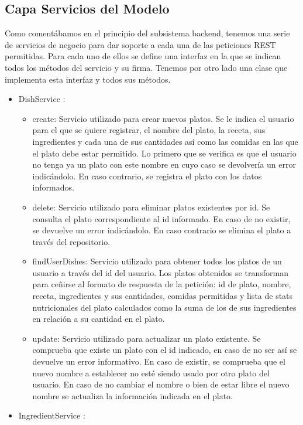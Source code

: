 \documentclass[12pt, a4paper, twoside]{book}
\begin{document}
	\subsection{Capa Servicios del Modelo}
	Como comentábamos en el principio del subsistema backend, tenemos una serie de servicios de negocio para dar soporte a cada una de las peticiones REST permitidas. 
	Para cada uno de ellos se define una interfaz en la que se indican todos los métodos del servicio y su firma. Tenemos por otro lado una clase que implementa esta interfaz y todos sus métodos.
	\begin{itemize}
		\item DishService : 
		\begin{itemize}
			\item create: Servicio utilizado para crear nuevos platos. Se le indica el usuario para el que se quiere registrar, el nombre del plato, la receta, sus ingredientes y cada una de sus cantidades así como las comidas en las que el plato debe estar permitido. Lo primero que se verifica es que el usuario no tenga ya un plato con este nombre en cuyo caso se devolvería un error indicándolo. En caso contrario, se registra el plato con los datos informados.
			\item delete: Servicio utilizado para eliminar platos existentes por id. Se consulta el plato correspondiente al id informado. En caso de no existir, se devuelve un error indicándolo. En caso contrario se elimina el plato a través del repositorio.
			\item findUserDishes: Servicio utilizado para obtener todos los platos de un usuario a través del id del usuario. Los platos obtenidos se transforman para ceñirse al formato de respuesta de la petición: id de plato, nombre, receta, ingredientes y sus cantidades, comidas permitidas y lista de stats nutricionales del plato calculados como la suma de los de sus ingredientes en relación a su cantidad en el plato.
			\item update: Servicio utilizado para actualizar un plato existente. Se comprueba que existe un plato con el id indicado, en caso de no ser así se devuelve un error informativo. En caso de existir, se comprueba que el nuevo nombre a establecer no esté siendo usado por otro plato del usuario. En caso de no cambiar el nombre o bien de estar libre el nuevo nombre se actualiza la información indicada en el plato.
		\end{itemize}
		\item IngredientService : 
		\begin{itemize}

\end{itemize}
\end{itemize}
\end{document}
